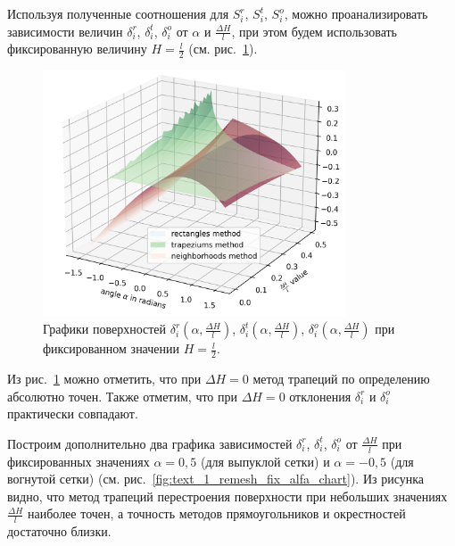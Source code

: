 \documentclass[
11pt,%
tightenlines,%
twoside,%
onecolumn,%
nofloats,%
nobibnotes,%
nofootinbib,%
superscriptaddress,%
noshowpacs,%
centertags]%
{revtex4}
\begin{document}
Используя полученные соотношения для $S_i^r$, $S_i^t$, $S_i^o$, можно проанализировать зависимости величин $\delta_i^r$, $\delta_i^t$, $\delta_i^o$ от $\alpha$ и $\frac{\Delta H}{l}$, при этом будем использовать фиксированную величину $H = \frac{l}{2}$ (см. рис.~\ref{fig:text_1_remesh_3d_main_chart}).

\begin{figure}[ht]
\setcaptionmargin{5mm}
\onelinecaptionstrue  %
\includegraphics[width=0.8\textwidth]{pics/remesh_3d_chart.png}
\caption{Графики поверхностей $\delta_i^r(\alpha, \frac{\Delta H}{l})$, $\delta_i^t(\alpha, \frac{\Delta H}{l})$, $\delta_i^o(\alpha, \frac{\Delta H}{l})$ при фиксированном значении $H = \frac{l}{2}$.}
\label{fig:text_1_remesh_3d_main_chart}
\end{figure}

Из рис.~\ref{fig:text_1_remesh_3d_main_chart} можно отметить, что при $\Delta H = 0$ метод трапеций по определению абсолютно точен.
Также отметим, что при $\Delta H = 0$ отклонения $\delta_i^r$ и $\delta_i^o$ практически совпадают.

Построим дополнительно два графика зависимостей $\delta_i^r$, $\delta_i^t$, $\delta_i^o$ от $\frac{\Delta H}{l}$ при фиксированных значениях $\alpha = 0,5$ (для выпуклой сетки) и $\alpha = -0,5$ (для вогнутой сетки) (см. рис.~\ref{fig:text_1_remesh_fix_alfa_chart}).
Из рисунка видно, что метод трапеций перестроения поверхности при небольших значениях $\frac{\Delta H}{l}$ наиболее точен, а точность методов прямоугольников и окрестностей достаточно близки.
\end{document}
